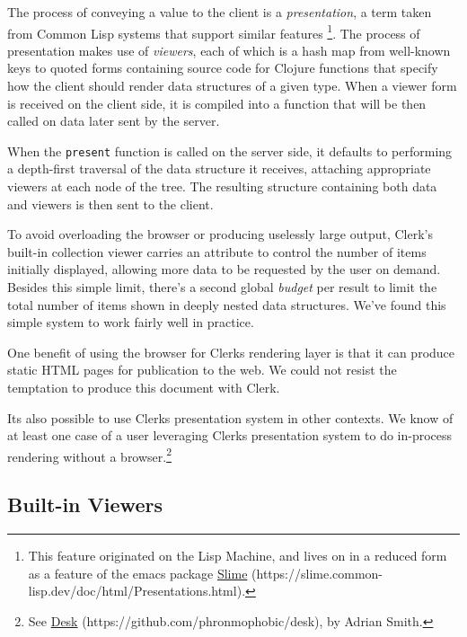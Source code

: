 \documentclass[sigconf,screen]{acmart}
\newcommand{\passthrough}[1]{#1}
\begin{document}
The process of conveying a value to the client is a \emph{presentation}, a
term taken from Common Lisp systems that support similar features \footnote{This feature originated on the Lisp Machine, and lives on in a reduced form as a feature of the emacs package {\href{https://slime.common-lisp.dev/doc/html/Presentations.html}{Slime} (https://slime.common-lisp.dev/doc/html/Presentations.html)}.}. The process of presentation makes use of \emph{viewers}, each of which is a hash map from well-known keys to quoted forms containing source code for Clojure functions that specify how the client should render data structures of a given type. When a viewer form is received on the client side, it is compiled into a function that will be then called on data later sent by the server.

When the \passthrough{\lstinline!present!} function is called on the server side, it defaults to performing a depth-first traversal of the data structure it receives, attaching appropriate viewers at each node of the tree. The resulting structure containing both data and viewers is then sent to the client.

To avoid overloading the browser or producing uselessly large output, Clerk's built-in collection viewer carries an attribute to control the number of items initially displayed, allowing more data to be requested by the user on demand. Besides this simple limit, there's a second global \emph{budget} per result to limit the total number of items shown in deeply nested data structures. We've found this simple system to work fairly well in practice.

One benefit of using the browser for Clerk\textquotesingle s rendering layer is that it can produce static HTML pages for publication to the web. We could not resist the temptation to produce this document with Clerk.

It\textquotesingle s also possible to use Clerk\textquotesingle s presentation system in other contexts. We know of at least one case of a user leveraging Clerk\textquotesingle s presentation system to do in-process rendering without a browser.\footnote{See {\href{https://github.com/phronmophobic/desk}{Desk} (https://github.com/phronmophobic/desk)}, by Adrian Smith.}

\hypertarget{built-in-viewers}{%
\subsection{Built-in Viewers}\label{built-in-viewers}}
\end{document}
